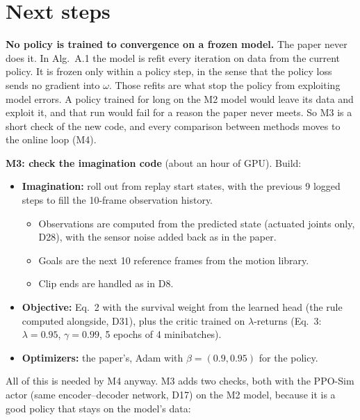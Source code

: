 \documentclass[10pt]{article}
\begin{document}
\section{Next steps}

\textbf{No policy is trained to convergence on a frozen model.} The paper never does it. In Alg.~A.1
the model is refit every iteration on data from the current policy. It is frozen only within a policy
step, in the sense that the policy loss sends no gradient into $\omega$. Those refits are what stop the
policy from exploiting model errors. A policy trained for long on the M2 model would leave its data and
exploit it, and that run would fail for a reason the paper never meets. So M3 is a short check of the
new code, and every comparison between methods moves to the online loop (M4).

\textbf{M3: check the imagination code} (about an hour of GPU). Build:
\begin{itemize}
  \item \textbf{Imagination:} roll out from replay start states, with the previous 9 logged steps to
  fill the 10-frame observation history.
  \begin{itemize}
    \item Observations are computed from the predicted state (actuated joints only, D28), with the
    sensor noise added back as in the paper.
    \item Goals are the next 10 reference frames from the motion library.
    \item Clip ends are handled as in D8.
  \end{itemize}
  \item \textbf{Objective:} Eq.~2 with the survival weight from the learned head (the rule computed
  alongside, D31), plus the critic trained on $\lambda$-returns
  (Eq.~3: $\lambda = 0.95$, $\gamma = 0.99$, 5 epochs of 4 minibatches).
  \item \textbf{Optimizers:} the paper's, Adam with $\beta = (0.9, 0.95)$ for the policy.
\end{itemize}
All of this is needed by M4 anyway. M3 adds two checks, both with the PPO-Sim actor (same
encoder--decoder network, D17) on the M2 model, because it is a good policy that stays on the model's
data:
\end{document}
